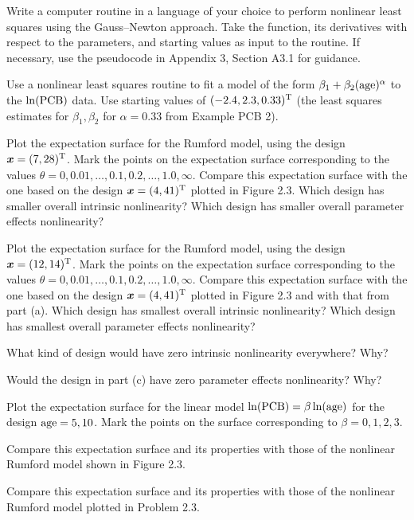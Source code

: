 \begin{problems}
  \prob
  Write a computer routine in a language of your choice to
  perform nonlinear least squares using the Gauss--Newton approach.
  Take the function, its derivatives with respect to the
  parameters, and starting values as input to the routine.
  If necessary, use the pseudocode in Appendix 3, Section A3.1
  for guidance.

  \prob
  Use a nonlinear least squares routine to fit a model of the form
  $\beta_1+\beta_2(\mbox{\rm age})^{\alpha}$ to the $\ln(\mbox{\rm PCB})$ data.
  Use starting values of $(-2.4,2.3,0.33)\trans$ (the least squares
  estimates for $\beta_1 ,\beta_{2}$ for $\alpha=0.33$ from
  Example PCB 2).

  \prob
  \subprob
  Plot the expectation surface for the Rumford model,
  using the design $\bx = ( 7,  28 ) \trans$.
  Mark the points on the expectation surface
  corresponding to the values
  $\theta=0,0.01,\ldots,0.1,0.2,\ldots,1.0,\infty$.
  Compare this expectation surface with the one based on
  the design $\bx = ( 4,  41 ) \trans$ plotted in Figure 2.3.
  Which design has smaller overall intrinsic nonlinearity?
  Which design has smaller overall parameter effects
  nonlinearity?
  
  \subprob                
  Plot the expectation surface for the Rumford model,
  using the design $\bx = ( 12,  14 ) \trans$.
  Mark the points on the expectation surface
  corresponding to the values
  $\theta=0,0.01,\ldots,0.1,0.2,\ldots,1.0,\infty$.
  Compare this expectation surface with the one based on
  the design $\bx=(4,41)\trans$ plotted in Figure 2.3 and
  with that from part (a).
  Which design has smallest overall intrinsic nonlinearity?
  Which design has smallest overall parameter effects
  nonlinearity?

  \subprob
  What kind of design would have zero intrinsic nonlinearity
  everywhere?  Why?

  \subprob
  Would the design in part (c) have zero parameter
  effects nonlinearity?  Why?

  \prob
  \subprob
  Plot the expectation surface for the linear model
  $\ln(\mbox{\rm PCB})=\beta\ln(\mbox{\rm age})$ for the design
  $\mbox{\rm age}=5,10$.
  Mark the points on the surface corresponding to
  $\beta=0,1,2,3$.

  \subprob
  Compare this expectation surface and its properties
  with those of the nonlinear Rumford model shown in
  Figure 2.3.

  \subprob
  Compare this expectation surface and its properties
  with those of the nonlinear Rumford model plotted in
  Problem 2.3.


\end{problems}
